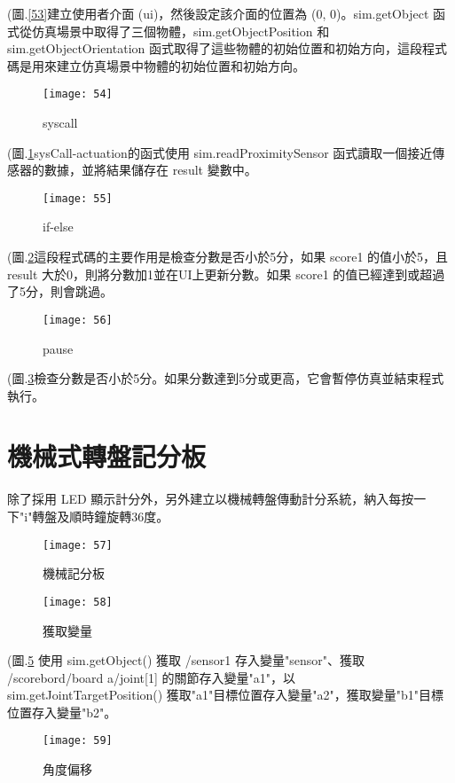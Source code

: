 \newpage
(圖.\ref{53}建立使用者介面 (ui)，然後設定該介面的位置為 (0, 0)。sim.getObject 函式從仿真場景中取得了三個物體，sim.getObjectPosition 和 sim.getObjectOrientation 函式取得了這些物體的初始位置和初始方向，這段程式碼是用來建立仿真場景中物體的初始位置和初始方向。\\
\begin{figure}[hbt!]
\begin{center}
\texttt{[image: 54]}
\caption{\Large syscall}\label{54}
\end{center}
\end{figure}

(圖.\ref{54}sysCall-actuation的函式使用 sim.readProximitySensor 函式讀取一個接近傳感器的數據，並將結果儲存在 result 變數中。\\
\newpage
\begin{figure}[hbt!]
\begin{center}
\texttt{[image: 55]}
\caption{\Large if-else}\label{55}
\end{center}
\end{figure}

(圖.\ref{55}這段程式碼的主要作用是檢查分數是否小於5分，如果 score1 的值小於5，且 result 大於0，則將分數加1並在UI上更新分數。如果 score1 的值已經達到或超過了5分，則會跳過。\\
\begin{figure}[hbt!]
\begin{center}
\texttt{[image: 56]}
\caption{\Large pause}\label{56}
\end{center}
\end{figure}

(圖.\ref{56}檢查分數是否小於5分。如果分數達到5分或更高，它會暫停仿真並結束程式執行。\\
\newpage
\section{機械式轉盤記分板}
  除了採用 LED 顯示計分外，另外建立以機械轉盤傳動計分系統，納入每按一下"i"轉盤及順時鐘旋轉36度。\\
\begin{figure}[hbt!]
\begin{center}
\texttt{[image: 57]}
\caption{\Large 機械記分板}\label{57}
\end{center}
\end{figure}
\newpage
\begin{figure}[hbt!]
\begin{center}
\texttt{[image: 58]}
\caption{\Large 獲取變量}\label{58}
\end{center}
\end{figure}
(圖.\ref{58} 使用 sim.getObject() 獲取 /sensor1 存入變量"sensor"、獲取 /scorebord/board a/joint[1] 的關節存入變量"a1"，以 sim.getJointTargetPosition() 獲取"a1"目標位置存入變量"a2"，獲取變量"b1"目標位置存入變量"b2"。\\
\begin{figure}[hbt!]
\begin{center}
\texttt{[image: 59]}
\caption{\Large 角度偏移}\label{59}
\end{center}
\end{figure}

